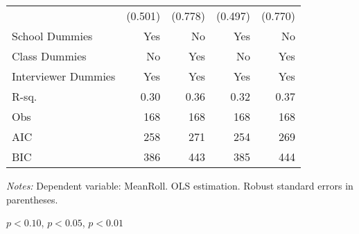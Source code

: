 \begin{table}[htbp]
\begin{threeparttable}
\begin{tabular}{l*{4}{D{.}{.}{-1}}}
                    &             (0.501)   &             (0.778)   &             (0.497)   &             (0.770)   \\
School Dummies      &                 Yes   &                  No   &                 Yes   &                  No   \\
Class Dummies       &                  No   &                 Yes   &                  No   &                 Yes   \\
Interviewer Dummies &                 Yes   &                 Yes   &                 Yes   &                 Yes   \\
\midrule
R-sq.               &                0.30   &                0.36   &                0.32   &                0.37   \\
Obs                 &                 168   &                 168   &                 168   &                 168   \\
AIC                 &                 258   &                 271   &                 254   &                 269   \\
BIC                 &                 386   &                 443   &                 385   &                 444   \\
\bottomrule
\end{tabular}
\begin{tablenotes}
\footnotesize
\item \textit{Notes:} Dependent variable: MeanRoll. OLS estimation. Robust standard errors in parentheses.
\item \sym{*} \(p<0.10\), \sym{**} \(p<0.05\), \sym{***} \(p<0.01\)
\end{tablenotes}
\end{threeparttable}
\label{tab:cheat_totaltr}
\end{table}
